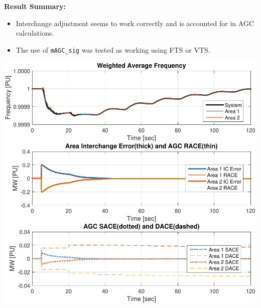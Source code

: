 \textbf{Result Summary:}
\begin{itemize}
\item Interchange adjustment seems to work correctly and is accounted for in AGC calculations.
\item The use of \verb|mAGC_sig| was tested as working using FTS or VTS.
\end{itemize}

\begin{minipage}{.5\linewidth}

\includegraphics[width=\linewidth]{examples/agcMod/agcSigs}
\end{minipage}%
